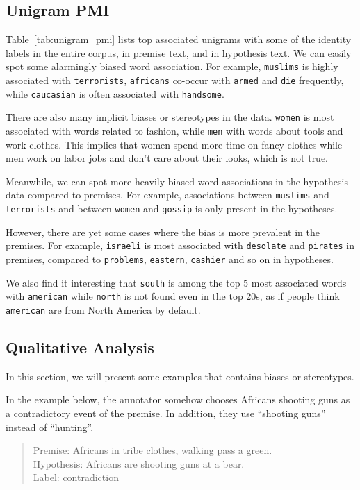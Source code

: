 \documentclass[11pt]{article}
\begin{document}
    \subsection{Unigram PMI}

    Table~\ref{tab:unigram_pmi} lists top associated unigrams with some of the identity labels in the entire corpus,
    in premise text, and in hypothesis text.
    We can easily spot some alarmingly biased word association.
    For example, \texttt{muslims} is highly associated with \texttt{terrorists}, \texttt{africans} co-occur with
    \texttt{armed} and \texttt{die} frequently, while \texttt{caucasian} is often associated with \texttt{handsome}.

    There are also many implicit biases or stereotypes in the data.
    \texttt{women} is most associated with words related to fashion, while \texttt{men} with words about
    tools and work clothes.
    This implies that women spend more time on fancy clothes while men work on labor
    jobs and don't care about their looks, which is not true.

    Meanwhile, we can spot more heavily biased word associations in the hypothesis data compared to premises.
    For example, associations between \texttt{muslims} and \texttt{terrorists} and between
    \texttt{women} and \texttt{gossip} is only present in the hypotheses.

    However, there are yet some cases where the bias is more prevalent in the premises.
    For example, \texttt{israeli} is most associated with \texttt{desolate} and \texttt{pirates} in premises,
    compared to \texttt{problems}, \texttt{eastern}, \texttt{cashier} and so on in hypotheses.

    We also find it interesting that \texttt{south} is among the top 5 most associated words with \texttt{american}
    while \texttt{north} is not found even in the top 20s, as if people think \texttt{american} are from North
    America by default.

    \subsection{Qualitative Analysis}

    In this section, we will present some examples that contains biases or stereotypes.

    In the example below, the annotator somehow chooses Africans shooting guns as a
    contradictory event of the premise.
    In addition, they use ``shooting guns'' instead of ``hunting''.
    \begin{quote}
        Premise: Africans in tribe clothes, walking pass a green. \\
        Hypothesis: Africans are shooting guns at a bear. \\
        Label: contradiction
    \end{quote}
\end{document}

